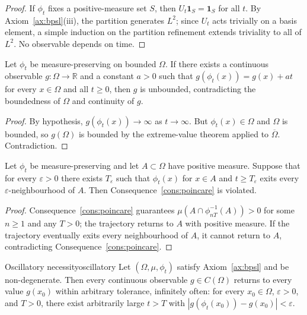 \begin{proof}
If $\phi_{t}$ fixes a positive-measure set $S$, then
$U_{t}\mathbf{1}_{S}=\mathbf{1}_{S}$ for all $t$.
By Axiom~\ref{ax:bpsl}(iii), the partition generates $L^{2}$; since
$U_{t}$ acts trivially on a basis element, a simple induction on the
partition refinement extends triviality to all of $L^{2}$.
No observable depends on time.
\end{proof}

\begin{lemma}
\label{lem:monotonicelim}
Let $\phi_{t}$ be measure-preserving on bounded $\Omega$.
If there exists a continuous observable $g\colon\Omega\to\mathbb{R}$ and
a constant $a>0$ such that $g(\phi_{t}(x))=g(x)+at$ for every
$x\in\Omega$ and all $t\ge 0$, then $g$ is unbounded, contradicting the
boundedness of $\Omega$ and continuity of $g$.
\end{lemma}

\begin{proof}
By hypothesis, $g(\phi_{t}(x))\to\infty$ as $t\to\infty$.
But $\phi_{t}(x)\in\Omega$ and $\Omega$ is bounded, so $g(\Omega)$ is
bounded by the extreme-value theorem applied to $\overline{\Omega}$.
Contradiction.
\end{proof}

\begin{lemma}
\label{lem:chaoticelim}
Let $\phi_{t}$ be measure-preserving and let $A\subset\Omega$ have positive
measure.
Suppose that for every $\varepsilon>0$ there exists $T_{\varepsilon}$ such
that $\phi_{t}(x)$ for $x\in A$ and $t\ge T_{\varepsilon}$ exits every
$\varepsilon$-neighbourhood of $A$.
Then Consequence~\ref{cons:poincare} is violated.
\end{lemma}

\begin{proof}
Consequence~\ref{cons:poincare} guarantees
$\mu(A\cap\phi_{nT}^{-1}(A))>0$ for some $n\ge 1$ and any $T>0$;
the trajectory returns to $A$ with positive measure.
If the trajectory eventually exits every neighbourhood of $A$, it cannot
return to $A$, contradicting Consequence~\ref{cons:poincare}.
\end{proof}

\begin{consequence}{Oscillatory necessity}{oscillatory}
Let $(\Omega,\mu,\phi_{t})$ satisfy Axiom~\ref{ax:bpsl} and be
non-degenerate.
Then every continuous observable $g\in C(\Omega)$ returns to every value
$g(x_{0})$ within arbitrary tolerance, infinitely often:
for every $x_{0}\in\Omega$, $\varepsilon>0$, and $T>0$, there exist
arbitrarily large $t>T$ with
$|g(\phi_{t}(x_{0}))-g(x_{0})|<\varepsilon$.
\end{consequence}

